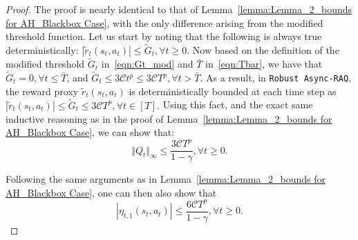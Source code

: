 \documentclass[10pt,a4paper]{amsart}
\newcommand{\mc}{\mathcal}
\begin{document}
\begin{proof} The proof is nearly identical to that of Lemma~\ref{lemma:Lemma_2_bounds for AH_Blackbox Case}, with the only difference arising from the modified threshold function. Let us start by noting that the following is always true deterministically: $|\tilde{r}_t(s_t, a_t)| \leq \tilde{G}_t, \forall t \geq 0.$ Now based on the definition of the modified threshold $\tilde{G}_t$ in~\eqref{eqn:Gt_mod} and $\bar{T}$ in~\eqref{eqn:Tbar}, we have that $\tilde{G}_t =0, \forall t \leq \bar{T}$, and $\tilde{G}_t \leq 3 \mc{C} t^{p} \leq 3 \mc{C} T^p, \forall t > \bar{T}.$ As a result, in \texttt{Robust Async-RAQ}, the reward proxy \(\tilde{r}_t(s_t,a_t)\) is deterministically bounded at each time step as \(|\tilde{r}_t(s_t,a_t)| \leq \tilde{G}_t \leq 3 \mathcal{C} T^p, \forall t \in [T].\) Using this fact, and the exact same inductive reasoning as in the proof of Lemma~\ref{lemma:Lemma_2_bounds for AH_Blackbox Case}, we can show that: 
\begin{equation}\label{eqn:Qtcourse_bnd}
    \Vert Q_t \Vert_{\infty} \le \frac{3 \mathcal{C} T^p}{1 - \gamma}, \forall t \geq 0.
\end{equation}

Following the same arguments as in Lemma~\ref{lemma:Lemma_2_bounds for AH_Blackbox Case}, one can then also show that 
\begin{equation}
\label{eqn:etaCourse_bnd}
\left| \eta_{t,1}(s_t,a_t) \right|  \leq  \frac{6 \mathcal{C} T^p}{1 - \gamma}, \forall t \geq 0.
\end{equation}


\end{proof}
\end{document}
